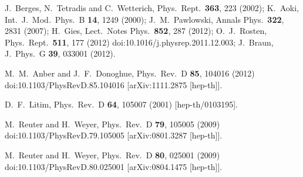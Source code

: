 \documentclass[twocolumn,prd,superscriptaddress,preprintnumbers,amsmath,amssymb,nofootinbib]{revtex4}
\begin{document}
\begin{thebibliography}{99}
  J.~Berges, N.~Tetradis and C.~Wetterich,
  Phys.\ Rept.\  {\bf 363}, 223 (2002);
  K.~Aoki,
  Int.\ J.\ Mod.\ Phys.\ B {\bf 14}, 1249 (2000);
  J.~M.~Pawlowski,
  Annals Phys.\  {\bf 322}, 2831 (2007);
  H.~Gies,
  Lect.\ Notes Phys.\  {\bf 852}, 287 (2012);
   O.~J.~Rosten,
  Phys.\ Rept.\  {\bf 511}, 177 (2012)
  doi:10.1016/j.physrep.2011.12.003;
  J.~Braun,
  J.\ Phys.\ G {\bf 39}, 033001 (2012).
  
  
  M.~M.~Anber and J.~F.~Donoghue,
  Phys.\ Rev.\ D {\bf 85}, 104016 (2012)
  doi:10.1103/PhysRevD.85.104016
  [arXiv:1111.2875 [hep-th]].
  
 
  

  D.~F.~Litim,
  Phys.\ Rev.\ D {\bf 64}, 105007 (2001)
  [hep-th/0103195].
  
  M.~Reuter and H.~Weyer,
  Phys.\ Rev.\ D {\bf 79}, 105005 (2009)
  doi:10.1103/PhysRevD.79.105005
  [arXiv:0801.3287 [hep-th]].
  
  M.~Reuter and H.~Weyer,
  Phys.\ Rev.\ D {\bf 80}, 025001 (2009)
  doi:10.1103/PhysRevD.80.025001
  [arXiv:0804.1475 [hep-th]].
  

\end{thebibliography}
\end{document}
